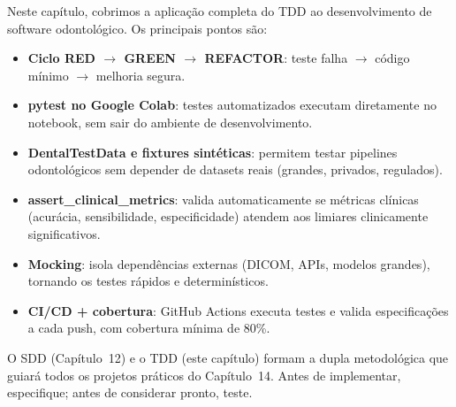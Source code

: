 Neste capítulo, cobrimos a aplicação completa do TDD ao desenvolvimento
de software odontológico. Os principais pontos são:

\begin{itemize}
  \item \textbf{Ciclo RED $\rightarrow$ GREEN $\rightarrow$ REFACTOR}:
    teste falha $\rightarrow$ código mínimo $\rightarrow$ melhoria segura.

  \item \textbf{pytest no Google Colab}: testes automatizados executam
    diretamente no notebook, sem sair do ambiente de desenvolvimento.

  \item \textbf{DentalTestData e fixtures sintéticas}: permitem testar
    pipelines odontológicos sem depender de datasets reais (grandes,
    privados, regulados).

  \item \textbf{assert\_clinical\_metrics}: valida automaticamente se
    métricas clínicas (acurácia, sensibilidade, especificidade) atendem
    aos limiares clinicamente significativos.

  \item \textbf{Mocking}: isola dependências externas (DICOM, APIs, modelos
    grandes), tornando os testes rápidos e determinísticos.

  \item \textbf{CI/CD + cobertura}: GitHub Actions executa testes e
    valida especificações a cada push, com cobertura mínima de 80\%.
\end{itemize}

O SDD (Capítulo~12) e o TDD (este capítulo) formam a dupla metodológica
que guiará todos os projetos práticos do Capítulo~14. Antes de implementar,
especifique; antes de considerar pronto, teste.
